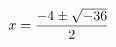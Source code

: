 \documentclass[preview]{standalone}
\begin{document}
\begin{align*}
\special{dvisvgm:raw <g id='unique000'>}x=\frac{-4\pm\sqrt{-36}}{2}\special{dvisvgm:raw </g>}
\end{align*}
\end{document}
